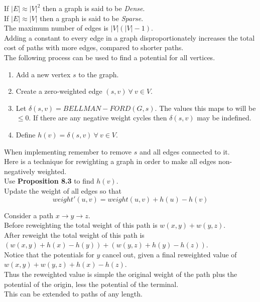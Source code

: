 \documentclass[11pt,a4paper]{article}
\begin{document}
If $|E|\approx|V|^2$ then a graph is said to be \textit{Dense}.\\
If $|E|\approx|V|$ then a graph is said to be \textit{Sparse}.\\
\nb The maximum number of edges is $|V|(|V|-1)$.\\

Adding a constant to every edge in a graph disproportionately increases the total cost of paths with more edges, compared to shorter paths.\\

The following process can be used to find a potential for all vertices.
\begin{enumerate}
	\item Add a new vertex $s$ to the graph.
	\item Create a zero-weighted edge $(s,v)\ \forall\ v\in V$.
	\item Let $\delta(s,v)=BELLMAN-FORD(G,s)$.
	The values this maps to will be $\leq 0$.
	If there are any negative weight cycles then $\delta(s,v)$ may be indefined.
	\item Define $h(v)=\delta(s,v)\ \forall\ v\in V$.
\end{enumerate}
\nb When implementing remember to remove $s$ and all edges connected to it.\\

Here is a technique for rewighting a graph in order to make all edges non-negatively weighted.\\
Use \textbf{Proposition 8.3} to find $h(v)$.\\
Update the weight of all edges so that
$$weight'(u,v)=weight(u,v)+h(u)-h(v)$$

\newpage
{}
Consider a path $x\to y\to z$.\\
Before reweighting the total weight of this path is $w(x,y)+w(y,z)$.\\
After reweight the total weight of this path is $(w(x,y)+h(x)-h(y))+(w(y,z)+h(y)-h(z))$.\\
Notice that the potentials for $y$ cancel out, given a final reweighted value of $w(x,y)+w(y,z)+h(x)-h(z)$.\\
Thus the reweighted value is simple the original weight of the path plus the potential of the origin, less the potential of the terminal.\\
This can be extended to paths of any length.\\
\end{document}
